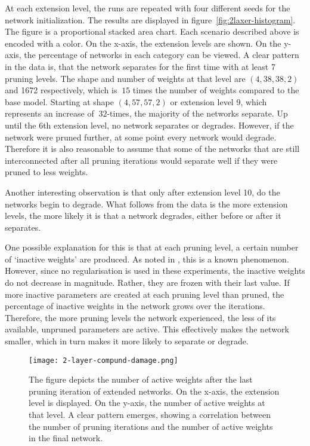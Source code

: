 At each extension level, the runs are repeated with four different seeds for the network initialization.
The results are displayed in figure~\ref{fig:2laxer-histogram}.
The figure is a proportional stacked area chart.
Each scenario described above is encoded with a color.
On the x-axis, the extension levels are shown.
On the y-axis, the percentage of networks in each category can be viewed.
A clear pattern in the data is, that the network separates for the first time with at least 7 pruning levels.
The shape and number of weights at that level are $(4,38,38,2)$ and 1672 respectively, which is $~15$ times the number of weights compared to the base model. 
Starting at shape $(4,57,57,2)$ or extension level 9, which represents an increase of $~32$-times, the majority of the networks separate.
Up until the 6th extension level, no network separates or degrades. 
However, if the network were pruned further, at some point every network would degrade.
Therefore it is also reasonable to assume that some of the networks that are still interconnected after all pruning iterations would separate well if they were pruned to less weights.

Another interesting observation is that only after extension level 10, do the networks begin to degrade.
What follows from the data is the more extension levels, the more likely it is that a network degrades, either before or after it separates.

One possible explanation for this is that at each pruning level, a certain number of `inactive weights' are produced.
As noted in \autocite{HanEtAl15, AllAlivePruning}, this is a known phenomenon.
However, since no regularisation is used in these experiments, the inactive weights do not decrease in magnitude.
Rather, they are frozen with their last value.
If more inactive parameters are created at each pruning level than pruned, the percentage of inactive weights in the network grows over the iterations.
Therefore, the more pruning levels the network experienced, the less of its available, unpruned parameters are active.
This effectively makes the network smaller, which in turn makes it more likely to separate or degrade.

\begin{figure}[ht]
    \centering
    \texttt{[image: 2-layer-compund-damage.png]}
    \caption{
        The figure depicts the number of active weights after the last pruning iteration of extended networks.
        On the x-axis, the extension level is displayed.
        On the y-axis, the number of active weights at that level.
        A clear pattern emerges, showing a correlation between the number of pruning iterations and the number of active weights in the final network.
    }\label{fig:collateral_damage}
\end{figure}

